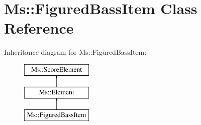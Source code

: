 \hypertarget{class_ms_1_1_figured_bass_item}{}\section{Ms\+:\+:Figured\+Bass\+Item Class Reference}
\label{class_ms_1_1_figured_bass_item}
Inheritance diagram for Ms\+:\+:Figured\+Bass\+Item\+:\begin{figure}[H]
\begin{center}
\leavevmode
\includegraphics[height=3.000000cm]{class_ms_1_1_figured_bass_item}
\end{center}
\end{figure}
